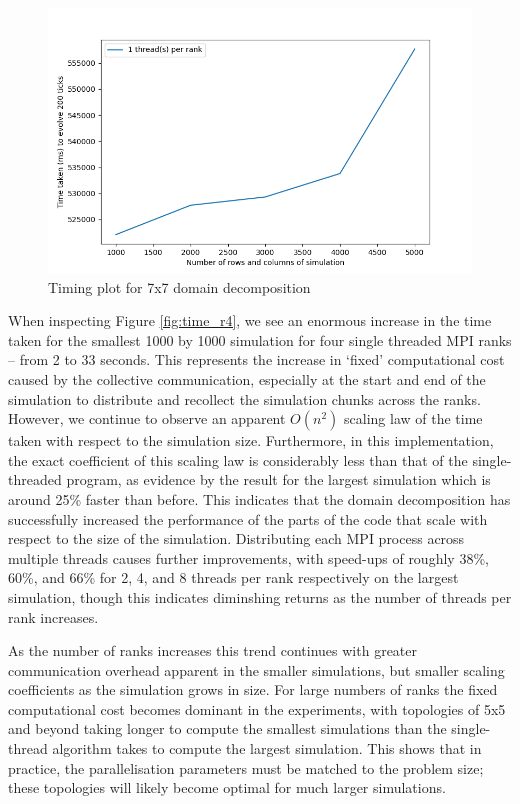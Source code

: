\documentclass[12pt]{article}
\begin{document}
\begin{figure}[hp]
    \includegraphics[scale=0.65, center]{figures/time_hybrid_r49_plot.png}
    \caption{Timing plot for 7x7 domain decomposition}
    \label{fig:time_r49}
\end{figure}

When inspecting Figure \ref{fig:time_r4}, we see an enormous increase in the time taken for the smallest 1000 by 1000 simulation for four single threaded MPI ranks -- from 2 to 33 seconds.
This represents the increase in `fixed' computational cost caused by the collective communication,
especially at the start and end of the simulation to distribute and recollect the simulation chunks across the ranks.
However, we continue to observe an apparent $O(n^2)$ scaling law of the time taken with respect to the simulation size.
Furthermore, in this implementation, the exact coefficient of this scaling law is considerably less than that of the single-threaded program,
as evidence by the result for the largest simulation which is around 25\% faster than before.
This indicates that the domain decomposition has successfully increased the performance of the parts of the code that scale with respect to the size of the simulation.
Distributing each MPI process across multiple threads causes further improvements,
with speed-ups of roughly 38\%, 60\%, and 66\% for 2, 4, and 8 threads per rank respectively on the largest simulation,
though this indicates diminshing returns as the number of threads per rank increases.

As the number of ranks increases this trend continues with greater communication overhead apparent in the smaller simulations,
but smaller scaling coefficients as the simulation grows in size.
For large numbers of ranks the fixed computational cost becomes dominant in the experiments,
with topologies of 5x5 and beyond taking longer to compute the smallest simulations than the single-thread algorithm takes to compute the largest simulation.
This shows that in practice, the parallelisation parameters must be matched to the problem size; these topologies will likely become optimal for much larger simulations.
\end{document}
